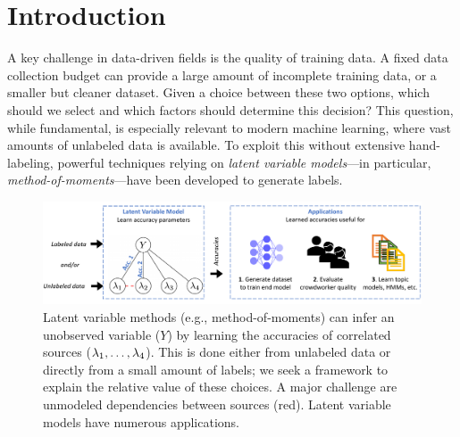  \section{Introduction}
\vspace{-.5em}
A key challenge in data-driven fields is the quality of training data. A fixed data collection budget can
provide a large amount of incomplete training data, or a smaller but cleaner dataset. Given a choice between these two options, which should we select and which factors should determine this decision? This question, while fundamental, is especially
relevant to modern machine learning, where vast amounts of unlabeled data is available. To exploit this without extensive hand-labeling, powerful techniques relying on \emph{latent variable models}---in particular, \emph{method-of-moments}---have been developed to generate labels.


\begin{figure}[t]
    \centering
    \includegraphics[width=.75\textwidth]{figures/maindiagram.pdf}
    \caption{Latent variable methods (e.g., method-of-moments) can infer an unobserved variable ($Y$) by learning the accuracies of correlated sources ($\lambda_1, \ldots, \lambda_4$). This is done either from unlabeled data or directly from a small amount of labels; we seek a framework to explain the relative value of these choices. A major challenge are unmodeled dependencies between sources (red). Latent variable models have numerous applications.}
    \label{fig:systemdiagram}
\end{figure}

